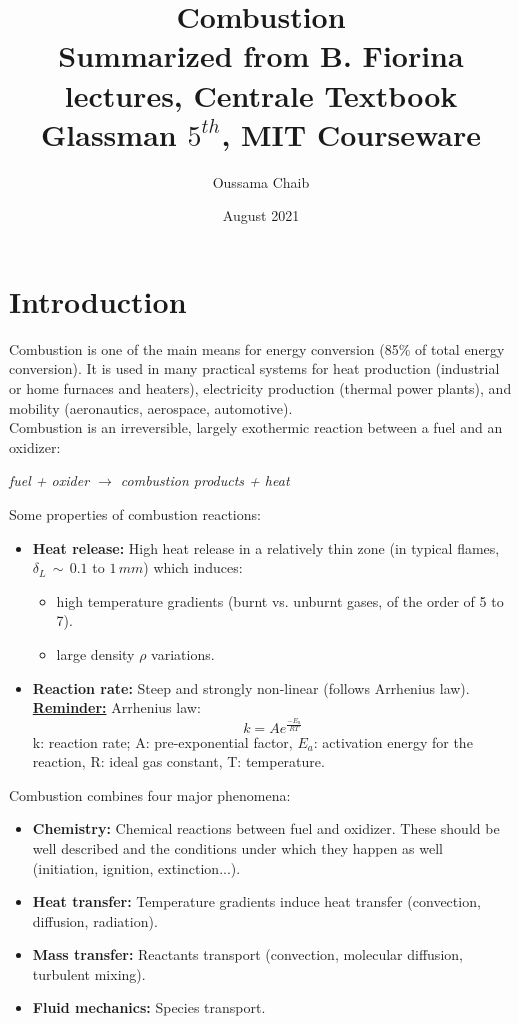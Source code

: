 \documentclass[a4paper,11pt]{article}
\title{%
Combustion \\
\vspace{10pt}
\small Summarized from B. Fiorina lectures, Centrale Textbook \\
Glassman $5^{th}$, MIT Courseware}
\author{\small Oussama Chaib}
\date{\small August 2021}
\begin{document}
\maketitle
\tableofcontents
\pagebreak
\section{Introduction}

Combustion is one of the main means for energy conversion (85\% of total energy conversion). It is used in many practical systems for heat production (industrial or home furnaces and heaters), electricity production (thermal power plants), and mobility (aeronautics, aerospace, automotive).\\
Combustion is an irreversible, largely exothermic reaction between a fuel and an oxidizer:
\begin{center}
\emph{fuel + oxider $\rightarrow$ combustion products + heat}
\end{center}
Some properties of combustion reactions:
\begin{itemize}
    \item \textbf{Heat release:} High heat release in a relatively thin zone (in typical flames, $\delta _L\,\sim\,0.1$ to $1\,mm$) which induces:
    \begin{itemize}
        \item high temperature gradients (burnt vs. unburnt gases, of the order of 5 to 7).
        \item large density $\rho$ variations.
    \end{itemize}
    \item \textbf{Reaction rate:} Steep and strongly non-linear (follows Arrhenius law).
    \vspace{8pt}
    \\
    \underline{\textbf{\small Reminder:}} Arrhenius law:
    \[k = Ae^{\frac{-E_a}{RT}}\]
    k: reaction rate; A: pre-exponential factor, $E_a$: activation energy for the reaction, R: ideal gas constant, T: temperature.
\end{itemize}
Combustion combines four major phenomena:
\begin{itemize}
    \item \textbf{Chemistry:} Chemical reactions between fuel and oxidizer. These should be well described and the conditions under which they happen as well (initiation, ignition, extinction...).
    \item \textbf{Heat transfer:} Temperature gradients induce heat transfer (convection, diffusion, radiation).
    \item \textbf{Mass transfer:} Reactants transport (convection, molecular diffusion, turbulent mixing).
    \item \textbf{Fluid mechanics:} Species transport.
\end{itemize}
\end{document}
